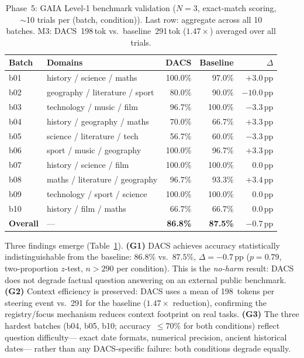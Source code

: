 \documentclass{article}
\begin{document}
\begin{table}[t]
\caption{Phase~5: GAIA Level-1 benchmark validation ($N{=}3$,
exact-match scoring, $\sim$10 trials per (batch, condition)).
Last row: aggregate across all 10 batches.
M3: DACS~198\,tok vs.\ baseline~291\,tok ($1.47\times$) averaged over all trials.}
\label{tab:phase5}
\centering
\footnotesize
\setlength{\tabcolsep}{4pt}
\begin{tabular}{llrrr}
\toprule
Batch & Domains & DACS & Baseline & $\Delta$ \\
\midrule
b01 & history / science / maths       & 100.0\% &  97.0\% & $+3.0$\,pp \\
b02 & geography / literature / sport  &  80.0\% &  90.0\% & $-10.0$\,pp \\
b03 & technology / music / film       &  96.7\% & 100.0\% & $-3.3$\,pp \\
b04 & history / geography / maths     &  70.0\% &  66.7\% & $+3.3$\,pp \\
b05 & science / literature / tech     &  56.7\% &  60.0\% & $-3.3$\,pp \\
b06 & sport / music / geography       & 100.0\% &  96.7\% & $+3.3$\,pp \\
b07 & history / science / film        & 100.0\% & 100.0\% & $0.0$\,pp \\
b08 & maths / literature / geography  &  96.7\% &  93.3\% & $+3.4$\,pp \\
b09 & technology / sport / science    & 100.0\% & 100.0\% & $0.0$\,pp \\
b10 & history / film / maths          &  66.7\% &  66.7\% & $0.0$\,pp \\
\midrule
\textbf{Overall} & --- & \textbf{86.8\%} & \textbf{87.5\%} & $-0.7$\,pp \\
\bottomrule
\end{tabular}
\end{table}

Three findings emerge (Table~\ref{tab:phase5}).
\textbf{(G1)} DACS achieves accuracy statistically indistinguishable from
the baseline: $86.8\%$ vs.\ $87.5\%$, $\Delta{=}{-}0.7$\,pp
($p{=}0.79$, two-proportion $z$-test, $n{>}290$ per condition).
This is the \emph{no-harm} result: DACS does not degrade factual
question answering on an external public benchmark.
\textbf{(G2)} Context efficiency is preserved: DACS uses a mean of
198~tokens per steering event vs.\ 291 for the baseline ($1.47\times$
reduction), confirming the registry/focus mechanism reduces context
footprint on real tasks.
\textbf{(G3)} The three hardest batches (b04, b05, b10;
accuracy~$\leq70\%$ for both conditions) reflect question difficulty---
exact date formats, numerical precision, ancient historical dates---
rather than any DACS-specific failure: both conditions degrade equally.
\end{document}
